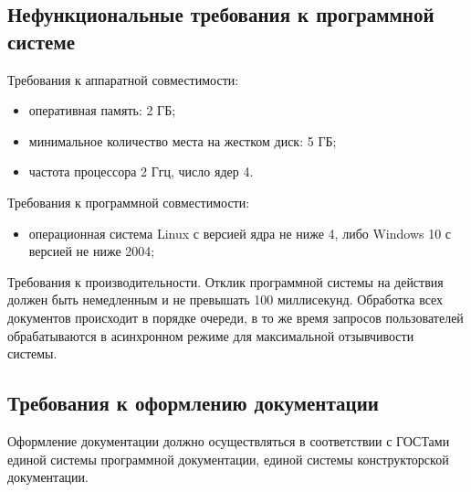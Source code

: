 \subsection{Нефункциональные требования к программной системе}

Требования к аппаратной совместимости: 

\begin{itemize}
	\item оперативная память: 2 ГБ;
	\item минимальное количество места на жестком диск: 5 ГБ;
	\item частота процессора 2 Ггц, число ядер 4.
\end{itemize}

Требования к программной совместимости:

\begin{itemize}
	\item операционная система Linux с версией ядра не ниже 4, либо Windows 10 с версией не ниже 2004;
\end{itemize}

Требования к производительности. Отклик программной системы на действия должен быть немедленным и не превышать 100 миллисекунд. Обработка всех документов происходит в порядке очереди, в то же время запросов пользователей обрабатываются в асинхронном режиме для максимальной отзывчивости системы.

\subsection{Требования к оформлению документации}

Оформление документации должно осуществляться в соответствии с ГОСТами единой системы программной документации, единой системы конструкторской документации.